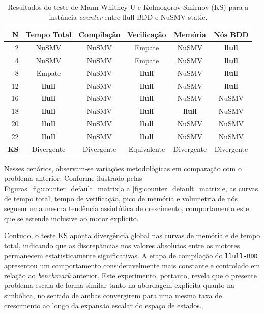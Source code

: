 \documentclass[cic,tc]{infufrgs}
\begin{document}
	\begin{table}[htbp]
		\centering
		\caption{Resultados do teste de Mann-Whitney U e Kolmogorov-Smirnov (KS) para a instância \textit{counter} entre llull-BDD e NuSMV-static.}
		\label{tab:estatistica_counter_default}
		\small
		\begin{tabular}{rccccc}
			\toprule
			\textbf{N} & \textbf{Tempo Total} & \textbf{Compilação} & \textbf{Verificação} & \textbf{Memória} & \textbf{Nós BDD} \\
			\midrule
			2  & NuSMV       & NuSMV       & Empate      & NuSMV       & \textbf{llull} \\
			4  & NuSMV       & NuSMV       & Empate      & NuSMV       & \textbf{llull} \\
			8  & Empate      & NuSMV       & \textbf{llull} & NuSMV       & \textbf{llull} \\
			12 & \textbf{llull} & NuSMV       & \textbf{llull} & NuSMV       & \textbf{llull} \\
			16 & \textbf{llull} & NuSMV       & \textbf{llull} & NuSMV       & NuSMV \\
			18 & \textbf{llull} & NuSMV       & \textbf{llull} & \textbf{llull} & NuSMV \\
			20 & \textbf{llull} & NuSMV       & \textbf{llull} & NuSMV       & NuSMV \\
			22 & \textbf{llull} & NuSMV       & \textbf{llull} & NuSMV       & NuSMV \\
			\midrule
			\textbf{KS} & Divergente & Divergente & Equivalente & Divergente & Divergente \\
			\bottomrule
		\end{tabular}
	\end{table}
	\FloatBarrier
	Nesses cenários, observam-se variações metodológicas em comparação com o problema anterior. Conforme ilustrado pelas Figuras~\ref{fig:counter_default_matrix}a a \ref{fig:counter_default_matrix}e, as curvas de tempo total, tempo de verificação, pico de memória e volumetria de nós seguem uma mesma tendência assintótica de crescimento, comportamento este que se estende inclusive ao motor explícito. 
	
	Contudo, o teste KS aponta divergência global nas curvas de memória e de tempo total, indicando que as discrepâncias nos valores absolutos entre os motores permanecem estatisticamente significativas. A etapa de compilação do \texttt{llull-BDD} apresentou um comportamento consideravelmente mais constante e controlado em relação ao \textit{benchmark} anterior. Este experimento, portanto, revela que o presente problema escala de forma similar tanto na abordagem explícita quanto na simbólica, no sentido de ambas convergirem para uma mesma taxa de crescimento ao longo da expansão escalar do espaço de estados.
	
\end{document}
